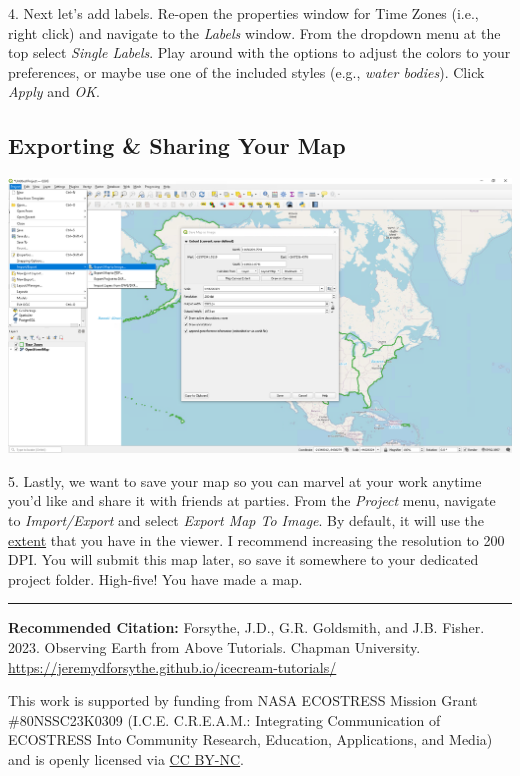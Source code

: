 \documentclass[oneside,a4paper,11pt,explicit]{book}
\begin{document}
4. Next let's add labels. Re-open the properties window for Time Zones (i.e., right click) and navigate to the \textit{Labels} window. From the dropdown menu at the top select \textit{Single Labels}. Play around with the options to adjust the colors to your preferences, or maybe use one of the included styles (e.g., \textit{water bodies}). Click \textit{Apply} and \textit{OK}. 

\subsection{Exporting \& Sharing Your Map}

\centerline{\includegraphics[width=\textwidth]{Export.png}}

5. Lastly, we want to save your map so you can marvel at your work anytime you'd like and share it with friends at parties. From the \textit{Project} menu, navigate to \textit{Import/Export} and select \textit{Export Map To Image}. By default, it will use the \href{https://en.wikipedia.org/wiki/Map_extent}{extent} that you have in the viewer. I recommend increasing the resolution to 200 DPI. You will submit this map later, so save it somewhere to your dedicated project folder. High-five! You have made a map. 



\hrule

\vspace{1em}

\small \textbf{Recommended Citation:} Forsythe, J.D., G.R. Goldsmith, and J.B. Fisher. 2023. Observing Earth from Above Tutorials. Chapman University. \url{https://jeremydforsythe.github.io/icecream-tutorials/}

\vspace{1em}

This work is supported by funding from NASA ECOSTRESS Mission Grant \#80NSSC23K0309 (I.C.E. C.R.E.A.M.: Integrating Communication of ECOSTRESS Into Community Research, Education, Applications, and Media) and is openly licensed via \href{https://creativecommons.org/licenses/by-nc/4.0/}{CC BY-NC}.
\end{document}
